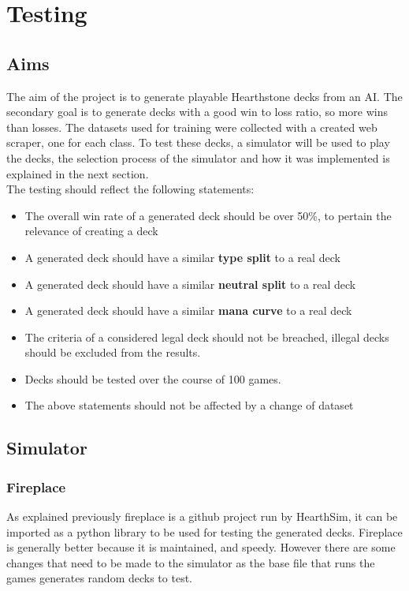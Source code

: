 \documentclass{report} %
\begin{document}
\chapter{Testing}
\section{Aims}
The aim of the project is to generate playable Hearthstone decks from an AI. The secondary goal is to generate decks with a good win to loss ratio, so more wins than losses. The datasets used for training were collected with a created web scraper, one for each class. To test these decks, a simulator will be used to play the decks, the selection process of the simulator and how it was implemented is explained in the next section.\\
The testing should reflect the following statements: 
\begin{itemize}
\item The overall win rate of a generated deck should be over 50\%, to pertain the relevance of creating a deck
\item A generated deck should have a similar \textbf{type split} to a real deck
\item A generated deck should have a similar \textbf{neutral split} to a real deck
\item A generated deck should have a similar \textbf{mana curve} to a real deck
\item The criteria of a considered legal deck should not be breached, illegal decks should be excluded from the results.
\item Decks should be tested over the course of 100 games.
\item The above statements should not be affected by a change of dataset
\end{itemize}
\section{Simulator}
\subsection{Fireplace}
As explained previously fireplace is a github project run by HearthSim, it can be imported as a python library to be used for testing the generated decks. Fireplace is generally better because it is maintained, and speedy. However there are some changes that need to be made to the simulator as the base file that runs the games generates random decks to test.
\end{document}
